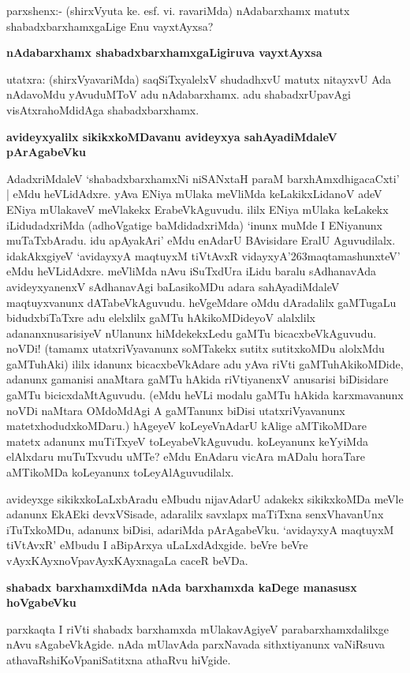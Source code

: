 parxshenx:- (shirxVyuta ke. esf. vi. ravariMda) nAdabarxhamx matutx shabadxbarxhamxgaLige Enu vayxtAyxsa?

\noindent
{\bf\large{nAdabarxhamx shabadxbarxhamxgaLigiruva vayxtAyxsa}}\label{160}

utatxra: (shirxVyavariMda) saqSiTxyalelxV shudadhxvU matutx nitayxvU Ada nAdavoMdu yAvuduMToV adu nAdabarxhamx. adu shabadxrUpavAgi visAtxrahoMdidAga shabadxbarxhamx.

\noindent
{\bf\large{avideyxyalilx sikikxkoMDavanu avideyxya sahAyadiMdaleV pArAgabeVku}}\label{page160}

AdadxriMdaleV `shabadxbarxhamxNi niSANxtaH paraM barxhAmxdhigacaCxti' | eMdu heVLidAdxre. yAva ENiya mUlaka meVliMda keLakikxLidanoV adeV ENiya mUlakaveV meVlakekx ErabeVkAguvudu. ililx ENiya mUlaka keLakekx iLidudadxriMda (adhoVgatige baMdidadxriMda) `inunx muMde I ENiyanunx muTaTxbAradu. idu apAyakAri' eMdu enAdarU BAvisidare EralU Aguvudilalx. idakAkxgiyeV `avidayxyA maqtuyxM tiVtAvxR\label{160} vidayxyA\char'263maqtamashunxteV' eMdu heVLidAdxre. meVliMda nAvu iSuTxdUra iLidu baralu sAdhanavAda avideyxyanenxV sAdhanavAgi baLasikoMDu adara sahAyadiMdaleV maqtuyxvanunx dATabeVkAguvudu. heVgeMdare oMdu dAradalilx gaMTugaLu bidudxbiTaTxre adu elelxlilx gaMTu hAkikoMDideyoV alalxlilx adananxnusarisiyeV nUlanunx hiMdekekxLedu gaMTu bicacxbeVkAguvudu. noVDi! (tamamx utatxriVyavanunx soMTakekx sutitx sutitxkoMDu alolxMdu gaMTuhAki) ililx idanunx bicacxbeVkAdare adu yAva riVti gaMTuhAkikoMDide, adanunx gamanisi anaMtara gaMTu hAkida riVtiyanenxV anusarisi biDisidare gaMTu bicicxdaMtAguvudu. (eMdu heVLi modalu gaMTu hAkida karxmavanunx noVDi naMtara OMdoMdAgi A gaMTanunx biDisi utatxriVyavanunx matetxhodudxkoMDaru.) hAgeyeV koLeyeVnAdarU kAlige aMTikoMDare matetx adanunx muTiTxyeV toLeyabeVkAguvudu. koLeyanunx keYyiMda elAlxdaru muTuTxvudu uMTe? eMdu EnAdaru vicAra mADalu horaTare aMTikoMDa koLeyanunx toLeyAlAguvudilalx.

avideyxge sikikxkoLaLxbAradu eMbudu nijavAdarU adakekx sikikxkoMDa meVle adanunx EkAEki devxVSisade, adaralilx savxlapx maTiTxna senxVhavanUnx iTuTxkoMDu, adanunx biDisi, adariMda pArAgabeVku. `avidayxyA maqtuyxM tiVtAvxR'\label{161} eMbudu I aBipArxya uLaLxdAdxgide. beVre beVre vAyxKAyxnoVpavAyxKAyxnagaLa caceR beVDa.

\noindent
{\bf\large{shabadx barxhamxdiMda nAda barxhamxda kaDege manasusx hoVgabeVku}}\label{page161}

parxkaqta I riVti shabadx barxhamxda mUlakavAgiyeV parabarxhamxdalilxge nAvu sAgabeVkAgide. nAda mUlavAda parxNavada sithxtiyanunx vaNiRsuva athavaRshiKoVpaniSatitxna athaRvu hiVgide.

